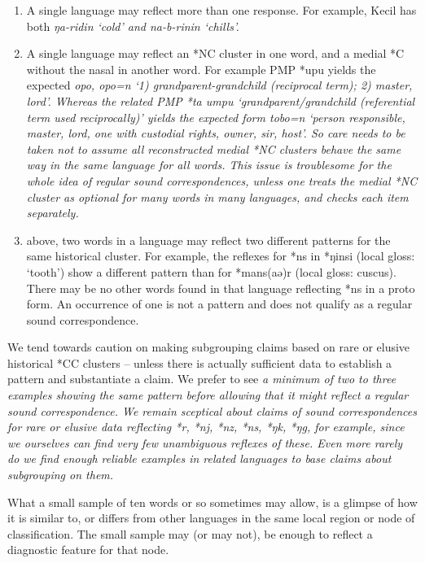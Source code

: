 \begin{enumerate}[label=(\alph*)]
{				ridi, riki}, or \it{lirin,} reflecting several different responses
				to the medial cluster.
	\item	A single language may reflect more than one response.
				For example,  Kecil has both \it{ŋa-ridin}
				‘cold’ and \it{na-b-rinin} ‘chills’.
	\item	A single language may reflect an *NC cluster in one word,
				and a medial *C without the nasal in another word.
				For example PMP *upu yields the expected  \it{opo,
				opo=n} ‘1) grandparent-grandchild (reciprocal term); 2) master, lord’.
				Whereas the related PMP *ta umpu ‘grandparent/grandchild (referential
				term used reciprocally)’ yields the expected  form \it{tobo=n}
				‘person responsible, master, lord, one with custodial rights, owner, sir, host’.
				So care needs to be taken not to assume all reconstructed medial
				*NC clusters behave the same way in the same language for all words.
				This issue is troublesome for the whole idea of regular sound
				correspondences, unless one treats the medial *NC cluster as optional for many
				words in many languages,
				and checks each item separately.
	\item	{} above,
				two words in a language may reflect two different patterns for
				the same historical cluster.
				For example, the reflexes for *ns in *ŋinsi (local gloss: ‘tooth’)
				show a different pattern than for *mans(aə)r (local gloss: cuscus).
				There may be no other words found in that language reflecting
				*ns in a proto form.
				An occurrence of one is not a pattern
				and does not qualify as a regular sound correspondence.	
\end{enumerate}

We tend towards caution on making subgrouping claims based on
rare or elusive historical *CC clusters -- unless there is actually
sufficient data to establish a pattern
and substantiate a claim.
We prefer to see \it{a minimum} of two to three examples showing
the same pattern before allowing that it might reflect a regular sound correspondence.
We remain sceptical about claims of sound correspondences for
rare or elusive data reflecting *r,
*nj, *nz, *ns, *ŋk,
*ŋg, for example, since we ourselves can find very few unambiguous reflexes of these.
Even more rarely do we find enough reliable examples in related
languages to base claims about subgrouping on them.

What a small sample of ten words or so sometimes may allow,
is a glimpse of how it is similar to,
or differs from other languages in the same local region or node of classification.
The small sample may (or may not),
be enough to reflect a diagnostic feature for that node.

